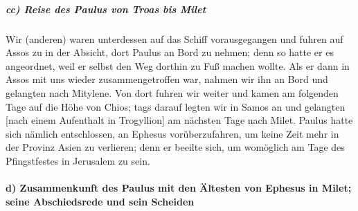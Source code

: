 \hypertarget{cc-reise-des-paulus-von-troas-bis-milet}{%
\subparagraph{cc) Reise des Paulus von Troas bis
Milet}\label{cc-reise-des-paulus-von-troas-bis-milet}}

 Wir (anderen) waren unterdessen auf das Schiff
vorausgegangen und fuhren auf Assos zu in der Absicht, dort Paulus an
Bord zu nehmen; denn so hatte er es angeordnet, weil er selbst den Weg
dorthin zu Fuß machen wollte.  Als er dann in Assos mit
uns wieder zusammengetroffen war, nahmen wir ihn an Bord und gelangten
nach Mitylene.  Von dort fuhren wir weiter und kamen am
folgenden Tage auf die Höhe von Chios; tags darauf legten wir in Samos
an und gelangten {[}nach einem Aufenthalt in Trogyllion{]} am nächsten
Tage nach Milet.  Paulus hatte sich nämlich entschlossen,
an Ephesus vorüberzufahren, um keine Zeit mehr in der Provinz Asien zu
verlieren; denn er beeilte sich, um womöglich am Tage des Pfingstfestes
in Jerusalem zu sein.

\hypertarget{d-zusammenkunft-des-paulus-mit-den-uxe4ltesten-von-ephesus-in-milet-seine-abschiedsrede-und-sein-scheiden}{%
\paragraph{d) Zusammenkunft des Paulus mit den Ältesten von Ephesus in
Milet; seine Abschiedsrede und sein
Scheiden}\label{d-zusammenkunft-des-paulus-mit-den-uxe4ltesten-von-ephesus-in-milet-seine-abschiedsrede-und-sein-scheiden}}

